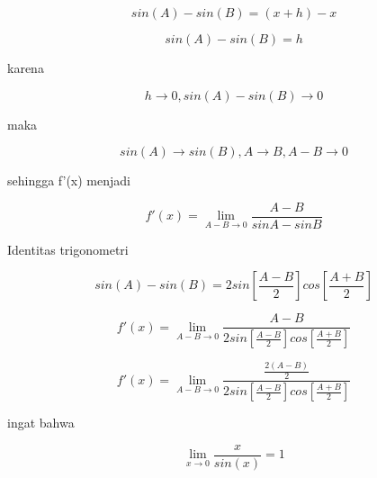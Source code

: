 \documentclass[a4paper,10pt]{article}
\begin{document}
\begin{eulernotebook}
\begin{eulercomment}
\begin{eulercomment}
\begin{eulercomment}
\end{eulercomment}
\begin{eulerformula}
\[
sin(A)-sin(B)=(x+h)-x
\]
\end{eulerformula}
\begin{eulerformula}
\[
sin(A)-sin(B) = h
\]
\end{eulerformula}
\begin{eulercomment}
karena\\
\end{eulercomment}
\begin{eulerformula}
\[
h \to 0, sin(A)-sin(B) \to 0
\]
\end{eulerformula}
\begin{eulercomment}
maka\\
\end{eulercomment}
\begin{eulerformula}
\[
sin(A)\to sin(B),  A \to B, A-B \to 0
\]
\end{eulerformula}
\begin{eulercomment}
sehingga f'(x) menjadi\\
\end{eulercomment}
\begin{eulerformula}
\[
f'(x) = \lim_{A-B \to 0} \frac{A-B}{sin A- sin B}
\]
\end{eulerformula}
\begin{eulercomment}
Identitas trigonometri\\
\end{eulercomment}
\begin{eulerformula}
\[
sin(A)-sin(B) = 2 sin[\frac{A-B}{2}]cos[\frac{A+B}{2}]
\]
\end{eulerformula}
\begin{eulercomment}
\end{eulercomment}
\begin{eulerformula}
\[
f'(x) = \lim_{A-B \to 0} \frac{A-B}{2 sin [\frac{A-B}{2}] cos [\frac{A+B}{2}]}
\]
\end{eulerformula}
\begin{eulerformula}
\[
f'(x) = \lim_{A-B \to 0} \frac{\frac{2(A-B)}{2}}{2 sin [\frac{A-B}{2}] cos [\frac{A+B}{2}]}
\]
\end{eulerformula}
\begin{eulercomment}
ingat bahwa\\
\end{eulercomment}
\begin{eulerformula}
\[
\lim_{x \to 0}\frac{x}{sin (x)}=1
\]
\end{eulerformula}

\end{eulercomment}
\end{eulercomment}
\end{eulernotebook}
\end{document}
